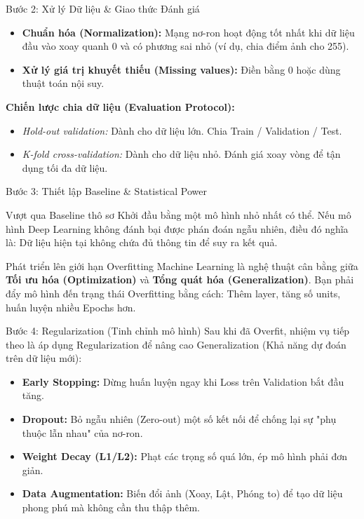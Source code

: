 \documentclass[aspectratio=169]{beamer}
\begin{document}
\begin{frame}{Bước 2: Xử lý Dữ liệu \& Giao thức Đánh giá}
    \begin{itemize}
        \item \textbf{Chuẩn hóa (Normalization):} Mạng nơ-ron hoạt động tốt nhất khi dữ liệu đầu vào xoay quanh 0 và có phương sai nhỏ (ví dụ, chia điểm ảnh cho 255).
        \item \textbf{Xử lý giá trị khuyết thiếu (Missing values):} Điền bằng 0 hoặc dùng thuật toán nội suy.
    \end{itemize}
    
    \vspace{0.5cm}
    \textbf{Chiến lược chia dữ liệu (Evaluation Protocol):}
    \begin{itemize}
        \item \textit{Hold-out validation:} Dành cho dữ liệu lớn. Chia Train / Validation / Test.
        \item \textit{K-fold cross-validation:} Dành cho dữ liệu nhỏ. Đánh giá xoay vòng để tận dụng tối đa dữ liệu.
    \end{itemize}
\end{frame}

\begin{frame}{Bước 3: Thiết lập Baseline \& Statistical Power}
    \begin{block}{Vượt qua Baseline thô sơ}
        Khởi đầu bằng một mô hình nhỏ nhất có thể. Nếu mô hình Deep Learning không đánh bại được phán đoán ngẫu nhiên, điều đó nghĩa là: Dữ liệu hiện tại không chứa đủ thông tin để suy ra kết quả.
    \end{block}

    \begin{block}{Phát triển lên giới hạn Overfitting}
        Machine Learning là nghệ thuật cân bằng giữa \textbf{Tối ưu hóa (Optimization)} và \textbf{Tổng quát hóa (Generalization)}. Bạn phải đẩy mô hình đến trạng thái Overfitting bằng cách: Thêm layer, tăng số units, huấn luyện nhiều Epochs hơn.
    \end{block}
\end{frame}

\begin{frame}{Bước 4: Regularization (Tinh chỉnh mô hình)}
    Sau khi đã Overfit, nhiệm vụ tiếp theo là áp dụng Regularization để nâng cao Generalization (Khả năng dự đoán trên dữ liệu mới):
    \begin{itemize}
        \item \textbf{Early Stopping:} Dừng huấn luyện ngay khi Loss trên Validation bắt đầu tăng.
        \item \textbf{Dropout:} Bỏ ngẫu nhiên (Zero-out) một số kết nối để chống lại sự "phụ thuộc lẫn nhau" của nơ-ron.
        \item \textbf{Weight Decay (L1/L2):} Phạt các trọng số quá lớn, ép mô hình phải đơn giản.
        \item \textbf{Data Augmentation:} Biến đổi ảnh (Xoay, Lật, Phóng to) để tạo dữ liệu phong phú mà không cần thu thập thêm.
    \end{itemize}
\end{frame}
\end{document}
